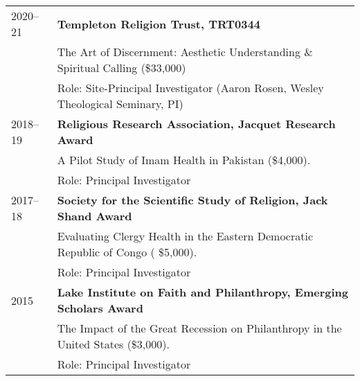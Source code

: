 \begin{longtable}{p{} p{}}
2020--21 & \textbf{Templeton Religion Trust, TRT0344} \\
& The Art of Discernment: Aesthetic Understanding \& Spiritual Calling (\$33,000)\\
& Role: Site-Principal Investigator (Aaron Rosen, Wesley Theological Seminary, PI)\\


2018--19 & \textbf{Religious Research Association, Jacquet Research Award}\\
& A Pilot Study of Imam Health in Pakistan (\$4,000). \\
& Role: Principal Investigator\\

2017--18 & \textbf{Society for the Scientific Study of Religion, Jack Shand Award} \\
& Evaluating Clergy Health in the Eastern Democratic Republic of Congo ( \$5,000). \\
& Role: Principal Investigator\\


2015 & \textbf{Lake Institute on Faith and Philanthropy, Emerging Scholars Award} \\
& The Impact of the Great Recession on Philanthropy in the United States (\$3,000). \\
& Role: Principal Investigator\\
\end{longtable}

